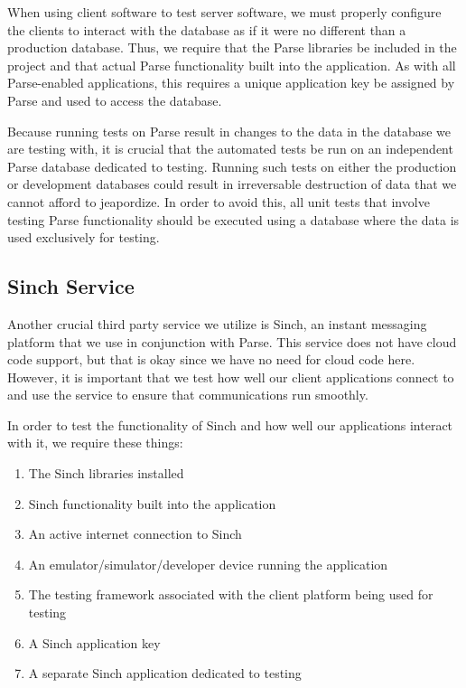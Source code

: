 When using client software to test server software, we must properly configure
the clients to interact with the database as if it were no different than a
production database. Thus, we require that the Parse libraries be included in
the project and that actual Parse functionality built into the application. As
with all Parse-enabled applications, this requires a unique application key be
assigned by Parse and used to access the database.

Because running tests on Parse result in changes to the data in the database we
are testing with, it is crucial that the automated tests be run on an
independent Parse database dedicated to testing. Running such tests on either
the production or development databases could result in irreversable destruction
of data that we cannot afford to jeapordize. In order to avoid this, all unit
tests that involve testing Parse functionality should be executed using a
database where the data is used exclusively for testing.


\subsection{Sinch Service}

Another crucial third party service we utilize is Sinch, an instant messaging
platform that we use in conjunction with Parse. This service does not have cloud
code support, but that is okay since we have no need for cloud code here.
However, it is important that we test how well our client applications connect
to and use the service to ensure that communications run smoothly.

In order to test the functionality of Sinch and how well our applications
interact with it, we require these things:

\begin{enumerate}
	\item The Sinch libraries installed
	\item Sinch functionality built into the application
	\item An active internet connection to Sinch
	\item An emulator/simulator/developer device running the application
	\item The testing framework associated with the client platform being used
	for testing
	\item A Sinch application key
	\item A separate Sinch application dedicated to testing
\end{enumerate}

